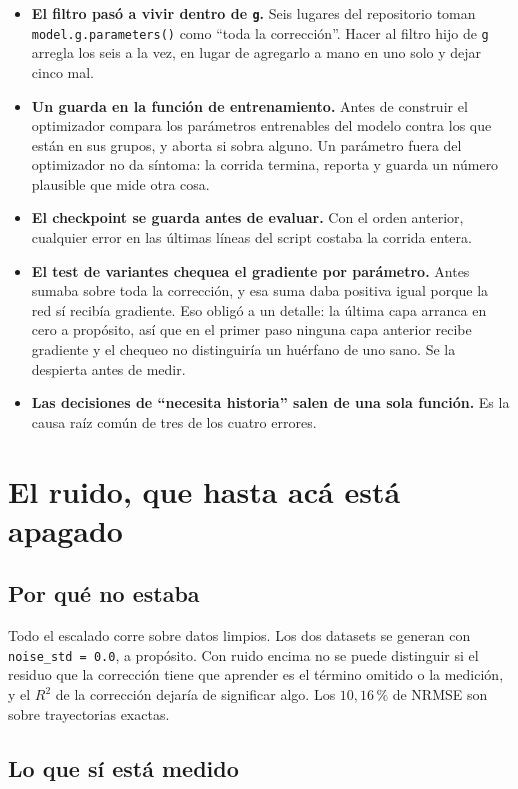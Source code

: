 \documentclass[11pt,a4paper]{article}
\begin{document}
\begin{itemize}
\item \textbf{El filtro pasó a vivir dentro de \texttt{g}.} Seis lugares del
  repositorio toman \texttt{model.g.parameters()} como ``toda la corrección''.
  Hacer al filtro hijo de \texttt{g} arregla los seis a la vez, en lugar de
  agregarlo a mano en uno solo y dejar cinco mal.
\item \textbf{Un guarda en la función de entrenamiento.} Antes de construir el
  optimizador compara los parámetros entrenables del modelo contra los que
  están en sus grupos, y aborta si sobra alguno. Un parámetro fuera del
  optimizador no da síntoma: la corrida termina, reporta y guarda un número
  plausible que mide otra cosa.
\item \textbf{El checkpoint se guarda antes de evaluar.} Con el orden anterior,
  cualquier error en las últimas líneas del script costaba la corrida entera.
\item \textbf{El test de variantes chequea el gradiente por parámetro.} Antes
  sumaba sobre toda la corrección, y esa suma daba positiva igual porque la red
  sí recibía gradiente. Eso obligó a un detalle: la última capa arranca en cero
  a propósito, así que en el primer paso ninguna capa anterior recibe gradiente
  y el chequeo no distinguiría un huérfano de uno sano. Se la despierta antes de
  medir.
\item \textbf{Las decisiones de ``necesita historia'' salen de una sola
  función.} Es la causa raíz común de tres de los cuatro errores.
\end{itemize}

\section{El ruido, que hasta acá está apagado}

\subsection{Por qué no estaba}

Todo el escalado corre sobre datos limpios. Los dos datasets se generan con
\texttt{noise\_std = 0.0}, a propósito. Con ruido encima no se puede distinguir
si el residuo que la corrección tiene que aprender es el término omitido o la
medición, y el $R^2$ de la corrección dejaría de significar algo. Los
$10{,}16\,\%$ de NRMSE son sobre trayectorias exactas.

\subsection{Lo que sí está medido}
\end{document}
